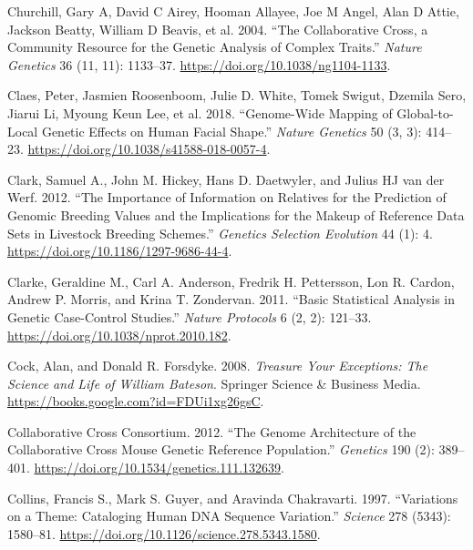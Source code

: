 \documentclass[
]{book}
\newlength{\cslhangindent}
\newlength{\cslentryspacingunit} %
\newenvironment{CSLReferences}[2] %
 {%
  \setlength{\parindent}{0pt}
  \ifodd #1
  \let\oldpar\par
  \def\par{\hangindent=\cslhangindent\oldpar}
  \fi
  \setlength{\parskip}{#2\cslentryspacingunit}
 }%
 {}
\begin{document}
\begin{CSLReferences}{1}{0}
\leavevmode{}%
Churchill, Gary A, David C Airey, Hooman Allayee, Joe M Angel, Alan D Attie, Jackson Beatty, William D Beavis, et al. 2004. {``The {Collaborative Cross}, a Community Resource for the Genetic Analysis of Complex Traits.''} \emph{Nature Genetics} 36 (11, 11): 1133--37. \url{https://doi.org/10.1038/ng1104-1133}.

\leavevmode{}%
Claes, Peter, Jasmien Roosenboom, Julie D. White, Tomek Swigut, Dzemila Sero, Jiarui Li, Myoung Keun Lee, et al. 2018. {``Genome-Wide Mapping of Global-to-Local Genetic Effects on Human Facial Shape.''} \emph{Nature Genetics} 50 (3, 3): 414--23. \url{https://doi.org/10.1038/s41588-018-0057-4}.

\leavevmode{}%
Clark, Samuel A., John M. Hickey, Hans D. Daetwyler, and Julius HJ van der Werf. 2012. {``The Importance of Information on Relatives for the Prediction of Genomic Breeding Values and the Implications for the Makeup of Reference Data Sets in Livestock Breeding Schemes.''} \emph{Genetics Selection Evolution} 44 (1): 4. \url{https://doi.org/10.1186/1297-9686-44-4}.

\leavevmode{}%
Clarke, Geraldine M., Carl A. Anderson, Fredrik H. Pettersson, Lon R. Cardon, Andrew P. Morris, and Krina T. Zondervan. 2011. {``Basic Statistical Analysis in Genetic Case-Control Studies.''} \emph{Nature Protocols} 6 (2, 2): 121--33. \url{https://doi.org/10.1038/nprot.2010.182}.

\leavevmode{}%
Cock, Alan, and Donald R. Forsdyke. 2008. \emph{Treasure {Your Exceptions}: {The Science} and {Life} of {William Bateson}}. {Springer Science \& Business Media}. \url{https://books.google.com?id=FDUi1xg26gsC}.

\leavevmode{}%
Collaborative Cross Consortium. 2012. {``The {Genome Architecture} of the {Collaborative Cross Mouse Genetic Reference Population}.''} \emph{Genetics} 190 (2): 389--401. \url{https://doi.org/10.1534/genetics.111.132639}.

\leavevmode{}%
Collins, Francis S., Mark S. Guyer, and Aravinda Chakravarti. 1997. {``Variations on a {Theme}: {Cataloging Human DNA Sequence Variation}.''} \emph{Science} 278 (5343): 1580--81. \url{https://doi.org/10.1126/science.278.5343.1580}.


\end{CSLReferences}
\end{document}
